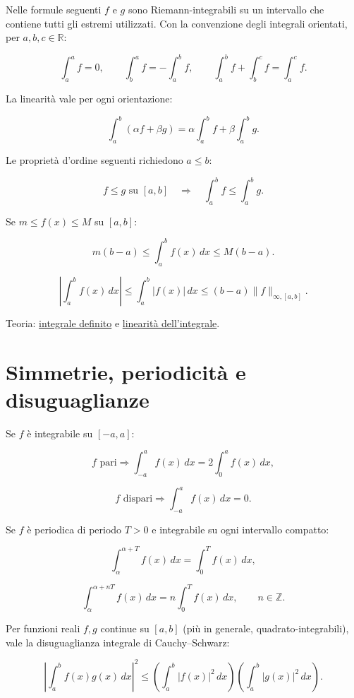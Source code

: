 Nelle formule seguenti \(f\) e \(g\) sono Riemann-integrabili su un intervallo che contiene tutti gli estremi utilizzati. Con la convenzione degli integrali orientati, per \(a,b,c\in\mathbb R\):

\[
\displaystyle
\int_a^a f=0,
\qquad
\int_b^a f=-\int_a^b f,
\qquad
\int_a^b f+\int_b^c f=\int_a^c f.
\]

La linearità vale per ogni orientazione:

\[
\displaystyle
\int_a^b(\alpha f+\beta g)
=
\alpha\int_a^b f+\beta\int_a^b g.
\]

Le proprietà d'ordine seguenti richiedono \(a\le b\):

\[
\displaystyle
f\le g\text{ su }[a,b]
\quad\Longrightarrow\quad
\int_a^b f\le\int_a^b g.
\]

Se \(m\le f(x)\le M\) su \([a,b]\):

\[
m(b-a)
\le
\int_a^b f(x)\,dx
\le
M(b-a).
\]

\[
\displaystyle
\left\lvert\int_a^b f(x)\,dx\right\rvert
\le
\int_a^b\lvert f(x)\rvert\,dx
\le
(b-a)\lVert f\rVert_{\infty,[a,b]}.
\]

Teoria: \href{https://ingegnerismo.it/matematica/integrale-definito/}{integrale definito} e \href{https://ingegnerismo.it/matematica/linearita-dell-integrale/}{linearità dell'integrale}.

\section{Simmetrie, periodicità e disuguaglianze}\label{simmetrie-periodicituxe0-e-disuguaglianze}

Se \(f\) è integrabile su \([-a,a]\):

\[
f\text{ pari}
\Longrightarrow
\int_{-a}^{a}f(x)\,dx=2\int_0^a f(x)\,dx,
\]

\[
f\text{ dispari}
\Longrightarrow
\int_{-a}^{a}f(x)\,dx=0.
\]

Se \(f\) è periodica di periodo \(T>0\) e integrabile su ogni intervallo compatto:

\[
\int_{\alpha}^{\alpha+T}f(x)\,dx
=
\int_0^T f(x)\,dx,
\]

\[
\int_{\alpha}^{\alpha+nT}f(x)\,dx
=n\int_0^T f(x)\,dx,
\qquad n\in\mathbb Z.
\]

Per funzioni reali \(f,g\) continue su \([a,b]\) (più in generale, quadrato-integrabili), vale la disuguaglianza integrale di Cauchy--Schwarz:

\[
\left|\int_a^b f(x)g(x)\,dx\right|^2
\le
\left(\int_a^b |f(x)|^2\,dx\right)
\left(\int_a^b |g(x)|^2\,dx\right).
\]

